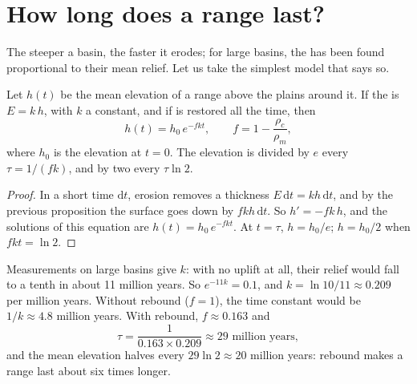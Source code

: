 \section{How long does a range last?}

The steeper a basin, the faster it erodes; for large basins, the  has been found proportional to their mean relief. Let us take the
simplest model that says so.

\begin{proposition}\label{prop:g12:destruction-of-mountains:decay}
Let $h(t)$ be the mean elevation of a range above the plains around it. If
the  is $E = k\,h$, with $k$ a constant, and if  is
restored all the time, then
\[
  h(t) = h_0\, e^{-f k t}, \qquad f = 1 - \frac{\rho_c}{\rho_m},
\]
where $h_0$ is the elevation at $t = 0$. The elevation is divided by $e$
every $\tau = 1/(fk)$, and by two every $\tau \ln 2$.
\end{proposition}

\begin{proof}
In a short time $\mathrm{d}t$, erosion removes a thickness $E\,\mathrm{d}t
= k h\,\mathrm{d}t$, and by the previous proposition the surface goes down
by $f k h\,\mathrm{d}t$. So $h' = -fk\,h$, and the solutions of this
equation are $h(t) = h_0\,e^{-fkt}$. At $t = \tau$, $h = h_0/e$; $h = h_0/2$
when $fkt = \ln 2$.
\end{proof}

Measurements on large basins give $k$: with no uplift at all, their relief
would fall to a tenth in about 11 million years. So $e^{-11k} = 0.1$, and $k =
\ln 10/11 \approx 0.209$ per million years. Without rebound ($f = 1$), the
time constant would be $1/k \approx 4.8$ million years. With rebound, $f
\approx 0.163$ and
\[
  \tau = \frac{1}{0.163 \times 0.209} \approx 29 \text{ million years},
\]
and the mean elevation halves every $29 \ln 2 \approx 20$ million years:
rebound makes a range last about six times longer.

